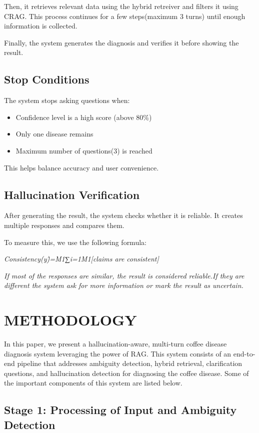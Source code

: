 \documentclass[conference]{IEEEtran}
\begin{document}
Then, it retrieves relevant data using the hybrid retreiver and filters it using CRAG. This process continues for a few steps(maximum 3 turns) until enough information is collected.

Finally, the system generates the diagnosis and verifies it before showing the result.

\subsection{Stop Conditions}

The system stops asking questions when:

\begin{itemize}
    \item Confidence level is a high score (above 80\%)
    \item Only one disease remains
    \item Maximum number of questions(3) is reached
\end{itemize}
This helps balance accuracy and user convenience.

\subsection{Hallucination Verification}

After generating the result, the system checks whether it is reliable. It creates multiple responses and compares them.

To measure this, we use the following formula:

\textit{Consistency(y\^)=M1∑i=1M1[claims are consistent]}

\textit{If most of the responses are similar, the result is considered reliable.If they are different the system ask for more information or mark the result as uncertain.}

\section{METHODOLOGY}
In this paper, we present a hallucination-aware, multi-turn coffee disease diagnosis system leveraging the power of RAG. This system consists of an end-to-end pipeline that addresses ambiguity detection, hybrid retrieval, clarification questions, and hallucination detection for diagnosing the coffee disease. Some of the important components of this system are listed below.

\subsection{Stage 1: Processing of Input and Ambiguity Detection}
\end{document}
